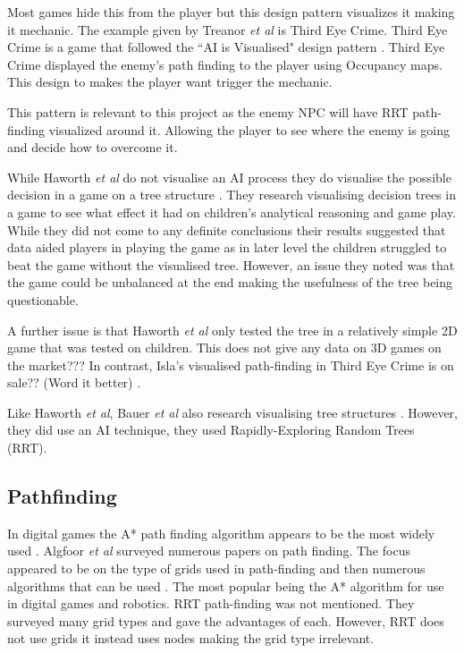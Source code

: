 \documentclass[journal]{IEEEtran}
\begin{document}
Most games hide this from the player but this design pattern visualizes it making it mechanic.  
The example given by Treanor \textit{et al} is Third Eye Crime.  Third Eye Crime is a game that followed the ``AI is Visualised" design pattern \cite{Isla2014}.  Third Eye Crime displayed the enemy's path finding to the player using Occupancy maps.  
This design to makes the player want trigger the mechanic.  

This pattern is relevant to this project as the enemy NPC  will have  RRT path-finding visualized around it. Allowing the player to see where the enemy is going and decide how to overcome it.

While Haworth \textit{et al} do not visualise an AI process they do visualise the possible decision in a game on a tree structure \cite{Haworth2010}. They research visualising decision trees in a game to see what effect it had on children's analytical reasoning and game play.  While they did not come to any definite conclusions their results suggested that data aided players in playing the game as in later level the children struggled to beat the game without the visualised tree. However, an issue they noted was that the game could be unbalanced at the end making the usefulness of the tree being questionable.  

A further issue is that Haworth \textit{et al} only tested the tree in a relatively simple 2D game that was tested on children. This does not give any data on 3D games on the market??? In contrast, Isla's visualised path-finding in Third Eye Crime is on sale?? (Word it better) \cite{Isla2014}.
 
Like  Haworth \textit{et al}, Bauer \textit{et al} also research visualising tree structures \cite{bauer2012}. However, they did use an AI technique, they used Rapidly-Exploring Random Trees (RRT).

\subsection{Pathfinding}
In digital games the A* path finding algorithm appears to be the most widely used \cite{Algfoor2015}.  Algfoor \textit{et al} surveyed numerous papers on path finding. The focus appeared to be on the type of grids used in path-finding and then numerous algorithms that can be used \cite{Algfoor2015}. The most popular being the A* algorithm for use in digital games and robotics. RRT path-finding was not mentioned. 
They surveyed many grid types and gave the advantages of each. However, RRT does not use grids it instead uses nodes making the grid type irrelevant.\\
\end{document}
